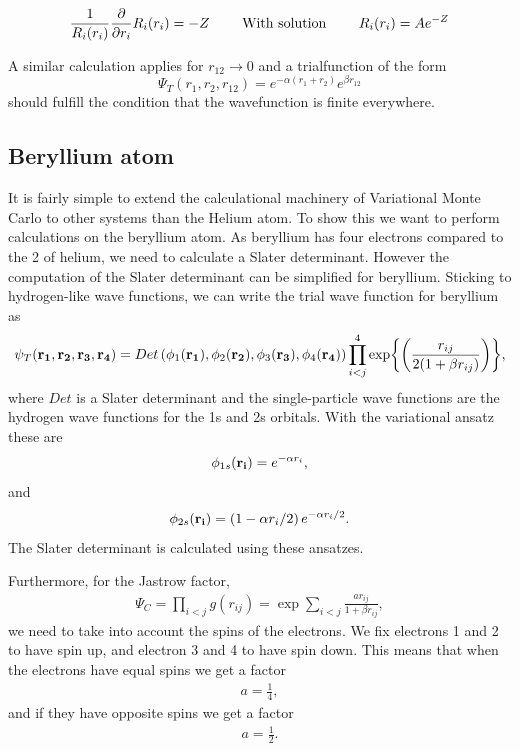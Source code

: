 \documentclass[11pt]{article}
\begin{document}
		\begin{align}
			 \frac{1}{R_i(r_i)} \pdv{}{r_i} R_i(r_i)	=  -Z  \qquad{ \text{ With solution }}  \qquad R_i(r_i) = A e^{-Z}
		\end{align}

		A similar calculation applies for \(r_{12} \rightarrow 0\) and a trialfunction of the form   \[\Psi_T(r_1,r_2,r_{12}) = e^{-\alpha (r_1 + r_2)} e^{\beta r_{12}} \] should fulfill the condition that the wavefunction is finite everywhere.

	\subsection{Beryllium atom}

		It is fairly simple to extend the calculational machinery of Variational
		Monte Carlo to other systems than the Helium atom. To show this we
		want to perform calculations on the beryllium atom. As beryllium has
		four electrons compared to the 2 of helium, we need to calculate a
		Slater determinant. However the computation of the Slater determinant
		can be simplified for beryllium. Sticking to hydrogen-like wave functions,
		we can write the trial wave function for beryllium as
		\begin{equation}
			\psi_{T}({\bf r_{1}},{\bf r_{2}},{\bf r_{3}},{\bf r_{4}})=Det\left(\phi_{1}({\bf r_{1}}),\phi_{2}({\bf r_{2}}),\phi_{3}({\bf r_{3}}),\phi_{4}({\bf r_{4}})\right)\prod_{i<j}^{4}\exp{\left(\frac{r_{ij}}{2(1+\beta r_{ij})}\right)},
			\label{eq:BerylliumTrialFunction}
		\end{equation}
		where $Det$ is a Slater determinant and the single-particle wave
		functions are the hydrogen wave functions for the 1s and 2s orbitals.
		With the variational ansatz these are
		\begin{align}
			\phi_{1s}({\bf r_{i}})=e^{-\alpha r_{i}},
		\end{align}
		and
		\begin{align}
			\phi_{2s}({\bf r_{i}})=\left(1-\alpha r_{i}/2\right)e^{-\alpha r_{i}/2}.
		\end{align}
		The Slater determinant is calculated using these ansatzes.

		Furthermore, for the Jastrow factor,
		\begin{align}
			\Psi_{C}=\prod_{i<j}g(r_{ij})=\exp{\sum_{i<j}\frac{ar_{ij}}{1+\beta r_{ij}}},
		\end{align}
		we need to take into account the spins of the electrons. We fix electrons
		1 and 2 to have spin up, and electron 3 and 4 to have spin down. This
		means that when the electrons have equal spins we get a factor
		\begin{align}
			a=\frac{1}{4},
		\end{align}
		and if they have opposite spins we get a factor
		\begin{align}
			a=\frac{1}{2}.
		\end{align}
\end{document}
